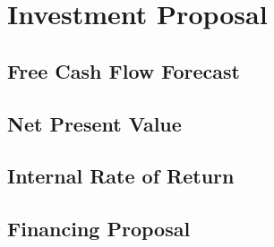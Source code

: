\chapter{Investment Proposal}\label{ch:investment}

\section{Free Cash Flow Forecast}\label{sec:fcf}

\section{Net Present Value}\label{sec:npv}

\section{Internal Rate of Return}\label{sec:irr}

\section{Financing Proposal}\label{sec:financing}

